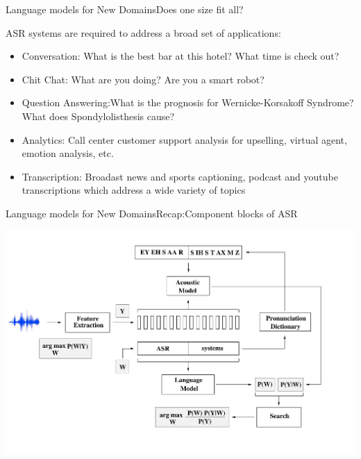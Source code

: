 \begin{frame} {Language models for New Domains}{Does one size fit all?}

ASR systems are required to address a broad set of applications:
 \begin{itemize}
 \item  {\color{red}Conversation:} What is the best bar at this hotel?  What time is check out?
 \item  {\color{red}Chit Chat:} What are you doing? Are you a smart robot?
 \item  {\color{red}Question Answering:}What is the prognosis for Wernicke-Korsakoff Syndrome? What does Spondylolisthesis cause?
 \item  {\color{red} Analytics:} Call center customer support analysis for upselling, virtual agent, emotion analysis, etc.
 \item {\color{red}Transcription:} Broadast news and sports captioning, podcast and youtube transcriptions which address a wide variety of topics
 \end{itemize}

\end{frame}


\begin{frame} {Language models for New Domains}{Recap:Component blocks of ASR}
  \begin{center}
    \includegraphics[scale=0.25]{figures/asrblock.pdf}
  \end{center}
\end{frame}

